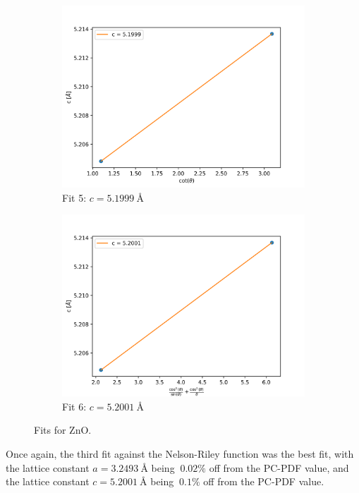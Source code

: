 \documentclass{article}
\begin{document}
\begin{figure}[h]
\begin {subfigure}{0.3\textwidth}
		\includegraphics[width=\textwidth]{Figures/ZnOCotC.png}
		\caption{Fit 5: $c=\SI{5.1999}{\angstrom}$}
		\label{fig:ZnOFit5}
	\end{subfigure}
	\hfill
	\begin {subfigure}{0.3\textwidth}
		\centering
		\includegraphics[width=\textwidth]{Figures/ZnONelsonC.png}
		\caption{Fit 6: $c=\SI{5.2001}{\angstrom}$}
		\label{fig:ZnOFit6}
	\end{subfigure}
\caption{Fits for ZnO.}
\label{fig:ZnOFits}
\end{figure}

Once again, the third fit against the Nelson-Riley function was the best fit, with the lattice constant $a=\SI{3.2493}{\angstrom}$
being $~ 0.02 \%$ off from the PC-PDF value, and the lattice constant $c=\SI{5.2001}{\angstrom}$ being $~ 0.1 \%$ off from the PC-PDF value. 
\end{document}

